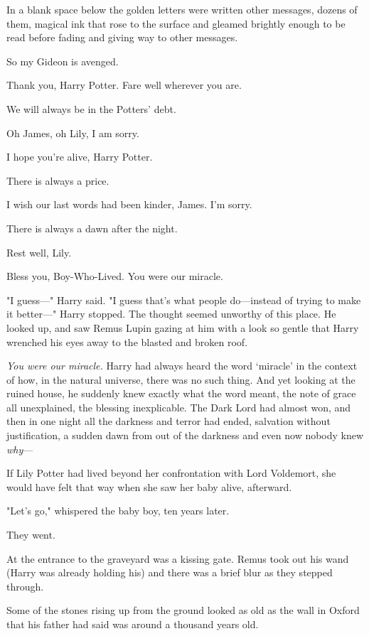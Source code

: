 In a blank space below the golden letters were written other messages, dozens
of them, magical ink that rose to the surface and gleamed brightly enough to be
read before fading and giving way to other messages.

\begin{center}
So my Gideon is avenged.

Thank you, Harry Potter. Fare well wherever you are.

We will always be in the Potters' debt.

Oh James, oh Lily, I am sorry.

I hope you're alive, Harry Potter.

There is always a price.

I wish our last words had been kinder, James. I'm sorry.

There is always a dawn after the night.

Rest well, Lily.

Bless you, Boy-Who-Lived. You were our miracle.
\end{center}

"I guess---" Harry said. "I guess that's what people do---instead of trying to
make it better---" Harry stopped. The thought seemed unworthy of this place. He
looked up, and saw Remus Lupin gazing at him with a look so gentle that Harry
wrenched his eyes away to the blasted and broken roof.

\emph{You were our miracle.} Harry had always heard the word `miracle' in the
context of how, in the natural universe, there was no such thing. And yet
looking at the ruined house, he suddenly knew exactly what the word meant, the
note of grace all unexplained, the blessing inexplicable. The Dark Lord had
almost won, and then in one night all the darkness and terror had ended,
salvation without justification, a sudden dawn from out of the darkness and
even now nobody knew \emph{why}---

If Lily Potter had lived beyond her confrontation with Lord Voldemort, she
would have felt that way when she saw her baby alive, afterward.

"Let's go," whispered the baby boy, ten years later.

They went.

At  the entrance to the graveyard was a kissing gate.
Remus took out his wand (Harry was already
holding his) and there was a brief blur as they stepped through.

Some of the stones rising up from the ground looked as old as the wall in
Oxford that his father had said was around a thousand years old.

